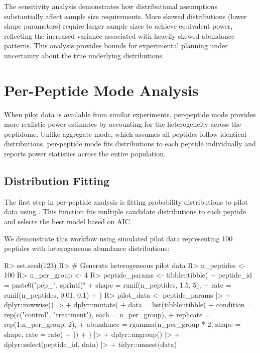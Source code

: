 \documentclass[article]{jss}
\begin{document}
The sensitivity analysis demonstrates how distributional assumptions substantially affect sample size requirements. More skewed distributions (lower shape parameters) require larger sample sizes to achieve equivalent power, reflecting the increased variance associated with heavily skewed abundance patterns. This analysis provides bounds for experimental planning under uncertainty about the true underlying distributions.

\section{Per-Peptide Mode Analysis} \label{sec:perpeptide}

When pilot data is available from similar experiments, per-peptide mode provides more realistic power estimates by accounting for the heterogeneity across the peptidome. Unlike aggregate mode, which assumes all peptides follow identical distributions, per-peptide mode fits distributions to each peptide individually and reports power statistics across the entire population.

\subsection{Distribution Fitting}

The first step in per-peptide analysis is fitting probability distributions to pilot data using . This function fits multiple candidate distributions to each peptide and selects the best model based on AIC.

We demonstrate this workflow using simulated pilot data representing 100 peptides with heterogeneous abundance distributions:

\begin{Schunk}
\begin{Sinput}
R> set.seed(123)
R> # Generate heterogeneous pilot data
R> n_peptides <- 100
R> n_per_group <- 4
R> peptide_params <- tibble::tibble(
+    peptide_id = paste0("pep_", sprintf("%
+    shape = runif(n_peptides, 1.5, 5),
+    rate = runif(n_peptides, 0.01, 0.1)
+  )
R> pilot_data <- peptide_params |>
+    dplyr::rowwise() |>
+    dplyr::mutate(
+      data = list(tibble::tibble(
+        condition = rep(c("control", "treatment"), each = n_per_group),
+        replicate = rep(1:n_per_group, 2),
+        abundance = rgamma(n_per_group * 2, shape = shape, rate = rate)
+      ))
+    ) |>
+    dplyr::ungroup() |>
+    dplyr::select(peptide_id, data) |>
+    tidyr::unnest(data)
\end{Sinput}
\end{Schunk}
\end{document}
